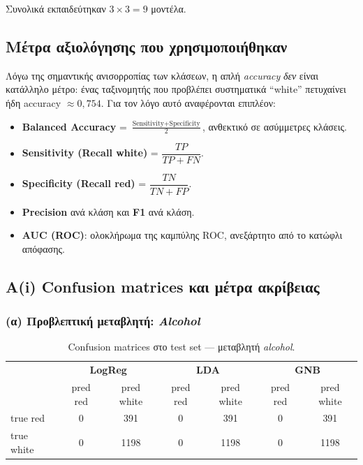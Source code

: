 \documentclass[11pt,a4paper]{article}
\begin{document}
Συνολικά εκπαιδεύτηκαν $3 \times 3 = 9$ μοντέλα.

\subsection{Μέτρα αξιολόγησης που χρησιμοποιήθηκαν}

Λόγω της σημαντικής ανισορροπίας των κλάσεων, η απλή \textit{accuracy}
\emph{δεν} είναι κατάλληλο μέτρο: ένας ταξινομητής που προβλέπει συστηματικά
``white'' πετυχαίνει ήδη accuracy $\approx 0{,}754$. Για τον λόγο αυτό
αναφέρονται επιπλέον:

\begin{itemize}[leftmargin=1.5cm]
    \item \textbf{Balanced Accuracy} =
    $\frac{\text{Sensitivity} + \text{Specificity}}{2}$,
    ανθεκτικό σε ασύμμετρες κλάσεις.
    \item \textbf{Sensitivity (Recall white)} =
    $\dfrac{TP}{TP + FN}$.
    \item \textbf{Specificity (Recall red)} =
    $\dfrac{TN}{TN + FP}$.
    \item \textbf{Precision} ανά κλάση και \textbf{F1} ανά κλάση.
    \item \textbf{AUC (ROC)}: ολοκλήρωμα της καμπύλης ROC, ανεξάρτητο από
    το κατώφλι απόφασης.
\end{itemize}

\subsection{Α(i) Confusion matrices και μέτρα ακρίβειας}

\subsubsection*{(α) Προβλεπτική μεταβλητή: \textit{Alcohol}}

\begin{table}[h!]
\centering
\caption{Confusion matrices στο test set — μεταβλητή \textit{alcohol}.}
\begin{tabular}{lcc|cc|cc}
\toprule
& \multicolumn{2}{c|}{\textbf{LogReg}} &
  \multicolumn{2}{c|}{\textbf{LDA}} &
  \multicolumn{2}{c}{\textbf{GNB}} \\
& pred red & pred white & pred red & pred white & pred red & pred white \\
\midrule
true red    & 0   & 391  & 0   & 391  & 0   & 391 \\
true white  & 0   & 1198 & 0   & 1198 & 0   & 1198 \\
\bottomrule
\end{tabular}
\end{table}
\end{document}
